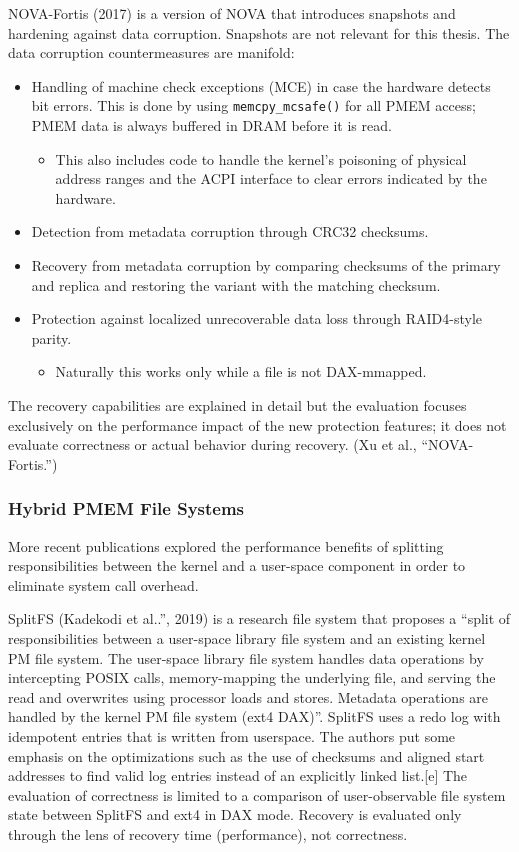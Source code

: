 \documentclass[12pt,a4paper,twoside,draft]{book}
\begin{document}
NOVA-Fortis (2017) is a version of NOVA that introduces snapshots and hardening against data corruption.
Snapshots are not relevant for this thesis. The data corruption countermeasures are manifold:
\begin{itemize}[noitemsep]
    \item Handling of machine check exceptions (MCE) in case the hardware detects bit errors. This is done by using \lstinline{memcpy_mcsafe()} for all PMEM access; PMEM data is always buffered in DRAM before it is read.
    \begin{itemize}
        \item This also includes code to handle the kernel’s poisoning of physical address ranges and the ACPI interface to clear errors indicated by the hardware.
    \end{itemize}
    \item Detection from metadata corruption through CRC32 checksums.
    \item Recovery from metadata corruption by comparing checksums of the primary and replica and restoring the variant with the matching checksum.
    \item Protection against localized unrecoverable data loss through RAID4-style parity.
    \begin{itemize}[noitemsep]
        \item Naturally this works only while a file is not DAX-mmapped.
    \end{itemize}
\end{itemize}
The recovery capabilities are explained in detail but the evaluation focuses exclusively on the performance impact of the new protection features; it does not evaluate correctness or actual behavior during recovery. (Xu et al., “NOVA-Fortis.”)

\subsubsection{Hybrid PMEM File Systems}\label{sec:hybrid_pmem_file_systems}
More recent publications explored the performance benefits of splitting responsibilities between the kernel and a user-space component in order to eliminate system call overhead.

SplitFS (Kadekodi et al..”, 2019) is a research file system that proposes a
  “split of responsibilities between a user-space library file system and an existing kernel PM file system.
  The user-space library file system handles data operations by intercepting POSIX calls, memory-mapping the underlying file, and serving the read and overwrites using processor loads and stores.
  Metadata operations are handled by the kernel PM file system (ext4 DAX)”.
SplitFS uses a redo log with idempotent entries that is written from userspace.
The authors put some emphasis on the optimizations such as the use of checksums and aligned start addresses to find valid log entries instead of an explicitly linked list.[e]
The evaluation of correctness is limited to a comparison of user-observable file system state between SplitFS and ext4 in DAX mode.
Recovery is evaluated only through the lens of recovery time (performance), not correctness.
\end{document}
